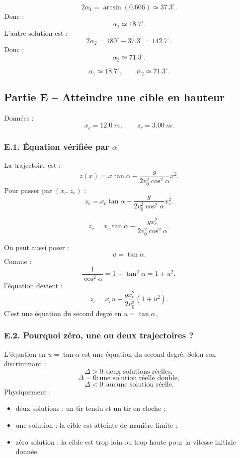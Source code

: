 \documentclass[11pt,a4paper]{article}
\begin{document}
\[
2\alpha_1=\arcsin(0.606)\simeq 37.3^\circ.
\]
Donc :
\[
\alpha_1\simeq 18.7^\circ.
\]
L'autre solution est :
\[
2\alpha_2=180^\circ-37.3^\circ=142.7^\circ.
\]
Donc :
\[
\alpha_2\simeq 71.3^\circ.
\]

\begin{resultatbox}
\[
\boxed{\alpha_1\simeq 18.7^\circ,\qquad \alpha_2\simeq 71.3^\circ.}
\]
\end{resultatbox}

\subsection{Partie E -- Atteindre une cible en hauteur}

Données :
\[
x_c=\SI{12.0}{m},\qquad z_c=\SI{3.00}{m}.
\]

\subsubsection*{E.1. Équation vérifiée par $\alpha$}

La trajectoire est :
\[
z(x)=x\tan\alpha-\frac{g}{2v_0^2\cos^2\alpha}x^2.
\]
Pour passer par $(x_c,z_c)$ :
\[
z_c=x_c\tan\alpha-\frac{g}{2v_0^2\cos^2\alpha}x_c^2.
\]

\begin{resultatbox}
\[
\boxed{
z_c=x_c\tan\alpha-\frac{g x_c^2}{2v_0^2\cos^2\alpha}.
}
\]
\end{resultatbox}

On peut aussi poser :
\[
u=\tan\alpha.
\]
Comme :
\[
\frac{1}{\cos^2\alpha}=1+\tan^2\alpha=1+u^2,
\]
l'équation devient :
\[
z_c=x_cu-\frac{gx_c^2}{2v_0^2}(1+u^2).
\]
C'est une équation du second degré en $u=\tan\alpha$.

\subsubsection*{E.2. Pourquoi zéro, une ou deux trajectoires ?}

L'équation en $u=\tan\alpha$ est une équation du second degré. Selon son discriminant :
\[
\Delta>0 : \text{deux solutions réelles},
\]
\[
\Delta=0 : \text{une solution réelle double},
\]
\[
\Delta<0 : \text{aucune solution réelle}.
\]
Physiquement :
\begin{itemize}
  \item deux solutions : un tir tendu et un tir en cloche ;
  \item une solution : la cible est atteinte de manière limite ;
  \item zéro solution : la cible est trop loin ou trop haute pour la vitesse initiale donnée.
\end{itemize}
\end{document}
